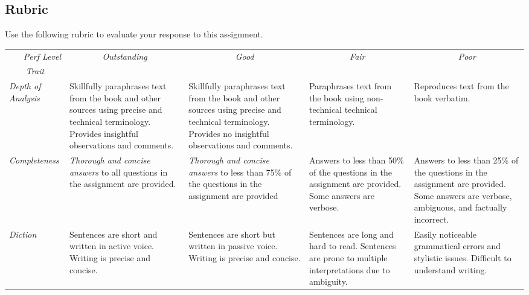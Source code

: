 \documentclass[11pt]{article}
\begin{document}
	
	\begin{landscape}
		
		\section{Rubric} \label{sec:Rubric}
		
		Use the following rubric to evaluate your response to this assignment.
		
		\vspace*{0.15in}
		
		\begin{tabular}{p{1.0in}p{1.5in}p{1.5in}p{1.5in}p{1.5in}} \toprule
			\multicolumn{1}{r}{\emph{Perf Level}} & \multicolumn{1}{c}{\emph{Outstanding}} & \multicolumn{1}{c}{\emph{Good}} & \multicolumn{1}{c}{\emph{Fair}} & \multicolumn{1}{c}{\emph{Poor}} \\ 
			\multicolumn{1}{c}{\emph{Trait}} & & & & \\ \midrule
			
			\emph{Depth of Analysis} & 
			Skillfully paraphrases text from the book and other sources using precise and technical terminology. Provides insightful observations and comments. & 
			Skillfully paraphrases text from the book and other sources using precise and technical terminology. Provides no insightful observations and comments. &
			Paraphrases text from the book using non-technical technical terminology. &
			Reproduces text from the book verbatim. \\ \midrule
			
			\emph{Completeness} &
			\emph{Thorough and concise answers} to all questions in the assignment are provided. &
			\emph{Thorough and concise answers} to less than 75\% of the questions in the assignment are provided &
			Answers to less than 50\% of the questions in the assignment are provided. Some answers are verbose. &
			Answers to less than 25\% of the questions in the assignment are provided. Some answers are verbose, ambiguous, and factually incorrect. \\ \midrule
			
			\emph{Diction} &
			Sentences are short and written in active voice. Writing is precise and concise. &
			Sentences are short but written in passive voice. Writing is precise and concise. &
			Sentences are long and hard to read. Sentences are prone to multiple interpretations due to ambiguity. &
			Easily noticeable grammatical errors and stylistic issues. Difficult to understand writing. 
			\\ \bottomrule
			
		\end{tabular}
		
		
	\end{landscape}
	
\end{document}
